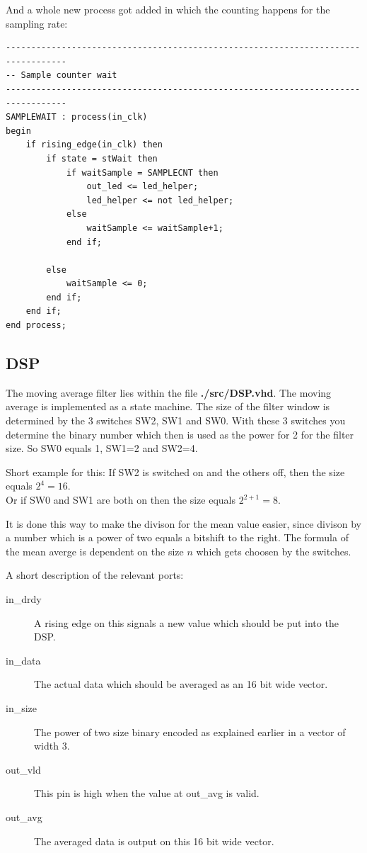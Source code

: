 \documentclass[%
	a4paper,
]
{article}
\begin{document}
And a whole new process got added in which the counting happens for the sampling rate:
\begin{lstlisting}
---------------------------------------------------------------------------------- 
-- Sample counter wait               
----------------------------------------------------------------------------------  
SAMPLEWAIT : process(in_clk)                                       
begin                                                       
	if rising_edge(in_clk) then   
		if state = stWait then                       
			if waitSample = SAMPLECNT then             
				out_led <= led_helper; 
				led_helper <= not led_helper; 
			else 
				waitSample <= waitSample+1; 
			end if;                                                            

		else                                                                   
			waitSample <= 0;
		end if;                  
	end if;                 
end process;
\end{lstlisting}

\subsection{DSP}
\label{sec:dsp}

The moving average filter lies within the file \textbf{./src/DSP.vhd}.
The moving average is implemented as a state machine. The size of the filter window is determined
by the 3 switches SW2, SW1 and SW0. With these 3 switches you determine the binary number which 
then is used as the power for 2 for the filter size. So SW0 equals 1, SW1=2 and SW2=4.


Short example for this:
If SW2 is switched on and the others off, then the size equals $2^{4}=16$. \\Or if SW0 and SW1 are both on then the
size equals $2^{2+1}=8$. 


It is done this way to make the divison for the mean value easier, since
divison by a number which is a power of two equals a bitshift to the right.
The formula of the mean averge is dependent on the size $n$ which gets choosen by the switches.

A short description of the relevant ports:
\begin{description}
\item[in\_drdy] A rising edge on this signals a new value which should be put into the DSP.
\item[in\_data] The actual data which should be averaged as an 16 bit wide vector.
\item[in\_size] The power of two size binary encoded as explained earlier in a vector of width 3.
\item[out\_vld] This pin is high when the value at out\_avg is valid.
\item[out\_avg] The averaged data is output on this 16 bit wide vector.
\end{description}
\end{document}
